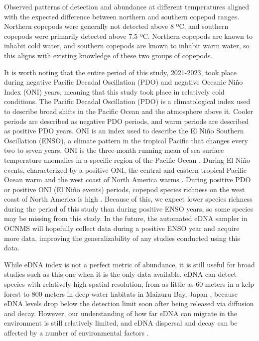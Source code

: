 \documentclass[12pt,twoside]{reedthesis}
\begin{document}
	Observed patterns of detection and abundance at different temperatures aligned with the expected difference between northern and southern copepod ranges. Northern copepods were generally not detected above 8 ºC, and southern copepods were primarily detected above 7.5 ºC. Northern copepods are known to inhabit cold water, and southern copepods are known to inhabit warm water, so this aligns with existing knowledge of these two groups of copepods. 
	
	It is worth noting that the entire period of this study, 2021-2023, took place during negative Pacific Decadal Oscillation (PDO) and negative Oceanic Niño Index (ONI) years, meaning that this study took place in relatively cold conditions. The Pacific Decadal Oscillation (PDO) is a climatological index used to describe broad shifts in the Pacific Ocean and the atmosphere above it. Cooler periods are described as negative PDO periods, and warm periods are described as positive PDO years. ONI is an index used to describe the El Niño Southern Oscillation (ENSO), a climate pattern in the tropical Pacific that changes every two to seven years. ONI is the three-month running mean of sea surface temperature anomalies in a specific region of the Pacific Ocean \autocite{ClimatePredictionCenterInternetTeam}. During El Niño events, characterized by a positive ONI, the central and eastern tropical Pacific Ocean warm and the west coast of North America warms \autocite{LHeureux2014}. During positive PDO or positive ONI (El Niño events) periods, copepod species richness on the west coast of North America is high \autocite{NOAAFisheries2024}. Because of this, we expect lower species richness during the period of this study than during positive ENSO years, so some species may be missing from this study. In the future, the automated eDNA sampler in OCNMS will hopefully collect data during a positive ENSO year and acquire more data, improving the generalizability of any studies conducted using this data. 
	
	While eDNA index is not a perfect metric of abundance, it is still useful for broad studies such as this one when it is the only data available. eDNA can detect species with relatively high spatial resolution, from as little as 60 meters in a kelp forest \autocite{Port2016} to 800 meters in deep-water habitats in Maizuru Bay, Japan \autocite{Yamamoto2017}, because eDNA levels drop below the detection limit soon after being released via diffusion and decay. However, our understanding of how far eDNA can migrate in the environment is still relatively limited, and eDNA dispersal and decay can be affected by a number of environmental factors \autocite{Cristescu2018}. 
	
\end{document}
